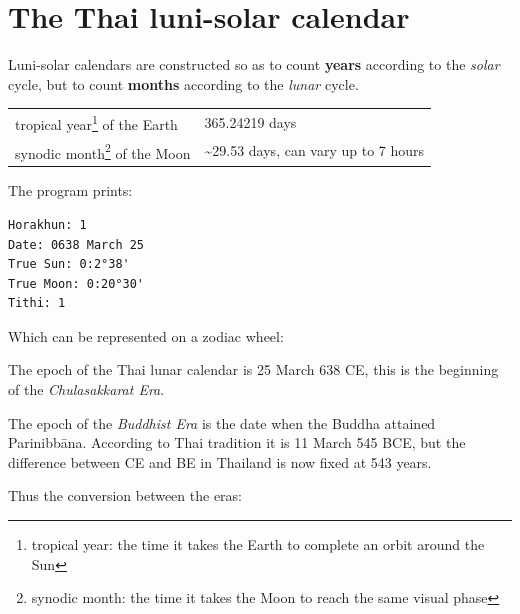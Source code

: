 \documentclass[11pt,oneside]{memoir-article}
\begin{document}
\clearpage

\chapter{The Thai luni-solar calendar}
\label{sec-3}

Luni-solar calendars are constructed so as to count \textbf{years} according to the
\emph{solar} cycle, but to count \textbf{months} according to the \emph{lunar} cycle.

\savenotes


\begin{center}
\begin{tabular}{ll}
tropical year\footnote{tropical year: the time it takes the Earth to complete an orbit around the Sun}
of the Earth & 365.24219 days\\
synodic month\footnote{synodic month: the time it takes the Moon to reach the same visual phase}
of the Moon & \textasciitilde{}29.53 days, can vary up to 7 hours\\
\end{tabular}
\end{center}

\spewnotes

\begin{marginfigure}[-\baselineskip]
\raggedright\footnotesize
The program prints:

\begin{verbatim}
Horakhun: 1
Date: 0638 March 25
True Sun: 0:2°38'
True Moon: 0:20°30'
Tithi: 1
\end{verbatim}

Which can be represented on a zodiac wheel:

\bigskip

{\centering
\resizebox{0.9\linewidth}{!}{\DuangChata[Sun={0/2/38}, Moon={0/20/30}, simple]}
\par}

\caption{Horakhun 1, first day of the CS Era}
\end{marginfigure}

The epoch of the Thai lunar calendar is 25 March 638 CE, this is the beginning
of the \emph{Chulasakkarat Era}.\autocite{eade1995calendrical}

The epoch of the \emph{Buddhist Era} is the date when the Buddha attained
Parinibbāna. According to Thai tradition it is 11 March 545 BCE, but the
difference between CE and BE in Thailand is now fixed at 543
years.\autocite{eade1995calendrical}

Thus the conversion between the eras:
\end{document}
